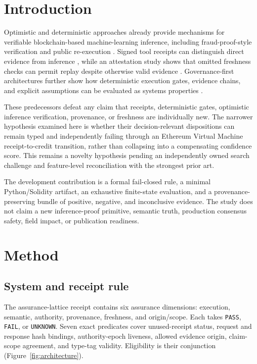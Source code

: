 \documentclass[utf8]{FrontiersinHarvard}
\begin{document}
\section{Introduction}

Optimistic and deterministic approaches already provide mechanisms for verifiable blockchain-based machine-learning inference, including fraud-proof-style verification and public re-execution \citep{conway2024opml,alves2026eigenai}. Signed tool receipts can distinguish direct evidence from inference \citep{basu2026toolreceipts}, while an attestation study shows that omitted freshness checks can permit replay despite otherwise valid evidence \citep{sokolov2026freshness}. Governance-first architectures further show how deterministic execution gates, evidence chains, and explicit assumptions can be evaluated as systems properties \citep{calboreanu2026lattice}.

These predecessors defeat any claim that receipts, deterministic gates, optimistic inference verification, provenance, or freshness are individually new. The narrower hypothesis examined here is whether their decision-relevant dispositions can remain typed and independently failing through an Ethereum Virtual Machine receipt-to-credit transition, rather than collapsing into a compensating confidence score. This remains a novelty hypothesis pending an independently owned search challenge and feature-level reconciliation with the strongest prior art.

The development contribution is a formal fail-closed rule, a minimal Python/Solidity artifact, an exhaustive finite-state evaluation, and a provenance-preserving bundle of positive, negative, and inconclusive evidence. The study does not claim a new inference-proof primitive, semantic truth, production consensus safety, field impact, or publication readiness.

\section{Method}

\subsection{System and receipt rule}

The assurance-lattice receipt contains six assurance dimensions: execution, semantic, authority, provenance, freshness, and origin/scope. Each takes \texttt{PASS}, \texttt{FAIL}, or \texttt{UNKNOWN}. Seven exact predicates cover unused-receipt status, request and response hash bindings, authority-epoch liveness, allowed evidence origin, claim-scope agreement, and type-tag validity. Eligibility is their conjunction (Figure~\ref{fig:architecture}).
\end{document}
